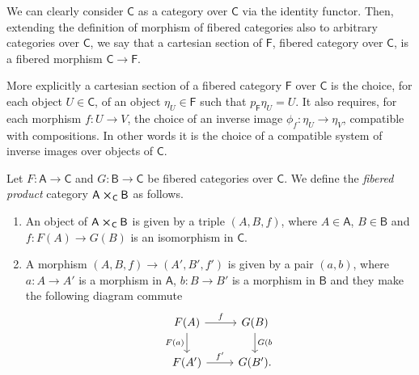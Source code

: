 \documentclass[../Main]{subfiles}
\begin{document}
\begin{defn}
	We can clearly consider $\mathsf{C}$ as a category over $\mathsf{C}$
	via the identity functor.
	Then, extending the definition of morphism of fibered categories also
	to arbitrary categories over $\mathsf{C}$, we say that
	a cartesian section of $\mathsf{F}$, fibered category over $\mathsf{C}$,
	is a fibered morphism $\mathsf{C} \to \mathsf{F}$.
\end{defn}


\begin{rem}[]
	More explicitly a cartesian section of a fibered category $\mathsf{F}$
	over $\mathsf{C}$ is the choice, for each object $U \in \mathsf{C}$,
	of an object $\eta_U \in \mathsf{F}$ such that $p_{\mathsf{F}} \eta_U = U$.
	It also requires, for each morphism $f\colon U \to V$, the choice of
	an inverse image $\phi_f\colon \eta_U \to \eta_V$,
	compatible with compositions.
	In other words it is the choice of a compatible
	system of inverse images over objects of $\mathsf{C}$.
\end{rem}


\begin{defn}
	Let $F\colon \mathsf{A} \to \mathsf{C}$ and $G\colon \mathsf{B} \to \mathsf{C}$
	be fibered categories over $\mathsf{C}$. 
	We define the {\em fibered product} category $\mathsf{A} \cross_{ \mathsf{C} } \mathsf{B}$
	as follows.
\begin{enumerate}
	\item An object of $\mathsf{A} \cross_{ \mathsf{C} } \mathsf{B}$ is given by a triple
		$\left(A, B, f\right)$, where $A \in \mathsf{A}$, $B \in \mathsf{B}$
		and $f\colon F(A) \to G(B)$ is an isomorphism in $\mathsf{C}$.

	\item A morphism $\left(A, B, f\right) \to  \left(A', B', f'\right)$
		is given by a pair $\left(a, b\right)$,
		where $a\colon A \to A'$ is a morphism in $\mathsf{A}$,
		$b\colon B \to B'$ is a morphism in $\mathsf{B}$
		and they make the following diagram commute
		\begin{equation*}
		\begin{tikzcd}
			F(A) \arrow[r, "f", rightarrow] 
			\arrow[d, "F(a)"', rightarrow] &
			G(B) \arrow[d, "G(b", rightarrow] \\
			F(A') \arrow[r, "f'", rightarrow] &
			G(B')
		.\end{tikzcd}
		\end{equation*}
\end{enumerate}
\end{defn}
\end{document}
